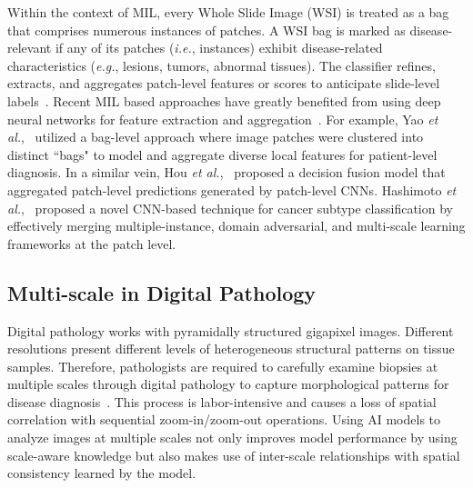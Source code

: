 \documentclass[times,twocolumn,final]{elsarticle}
\begin{document}
Within the context of MIL, every Whole Slide Image (WSI) is treated as a bag that comprises numerous instances of patches. A WSI bag is marked as disease-relevant if any of its patches (\textit{i.e.}, instances) exhibit disease-related characteristics (\textit{e.g.}, lesions, tumors, abnormal tissues). The classifier refines, extracts, and aggregates patch-level features or scores to anticipate slide-level labels~\citep{Li_2021_CVPR}. Recent MIL based approaches have greatly benefited from using deep neural networks for feature extraction and  aggregation~\citep{ilse2018attention,wang2016deep,oquab2015object}. For example, Yao \textit{et al.},~\citep{yao2020whole} utilized a bag-level approach where image patches were clustered into distinct ``bags" to model and aggregate diverse local features for patient-level diagnosis. In a similar vein, Hou \textit{et al.},~\citep{hou2016patch} proposed a decision fusion model that aggregated patch-level predictions generated by patch-level CNNs. Hashimoto \textit{et al.},~\citep{hashimoto2020multi} proposed a novel CNN-based technique for cancer subtype classification by effectively merging multiple-instance, domain adversarial, and multi-scale learning frameworks at the patch level.

\subsection{Multi-scale in Digital Pathology}


Digital pathology works with pyramidally structured gigapixel images. Different resolutions present different levels of heterogeneous structural patterns on tissue samples. Therefore, pathologists are required to carefully examine biopsies at multiple scales through digital pathology to capture morphological patterns for disease diagnosis~\citep{gordon2020histopathology}. This process is labor-intensive and causes a loss of spatial correlation with sequential zoom-in/zoom-out operations. Using AI models to analyze images at multiple scales not only improves model performance by using scale-aware knowledge but also makes use of inter-scale relationships with spatial consistency learned by the model. 
\end{document}
